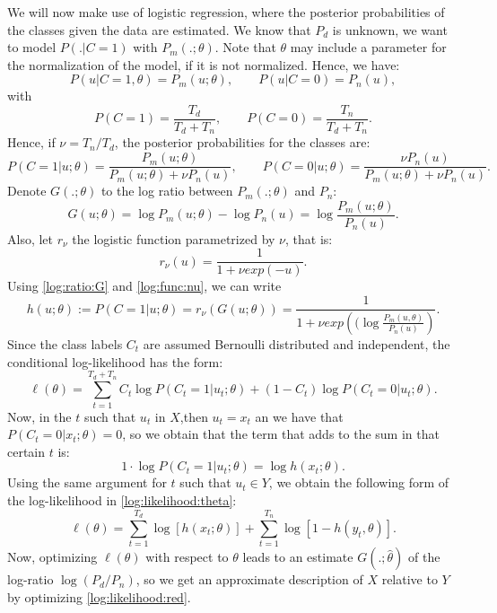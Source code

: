 We will now make use of logistic regression, where the posterior probabilities of the classes given the data are estimated. We know that $P_d$ is unknown, we want to model $P(.|C=1)$ with $P_m(.;\theta)$. Note that $\theta$ may include a parameter for the normalization of the model, if it is not normalized. Hence, we have:
\[
P(u|C = 1,\theta) = P_m(u;\theta), \quad \quad P(u|C = 0) = P_n(u),
\]
with
\[
P(C = 1) = \frac{T_d}{T_d + T_n}, \quad \quad P(C = 0) = \frac{T_n}{T_d + T_n}.
\]
Hence, if $\nu = T_n/T_d$, the posterior probabilities for the classes are:
\[
P(C=1|u;\theta) = \frac{P_m(u;\theta)}{P_m(u;\theta) + \nu P_n(u)}, \quad \quad P(C = 0|u; \theta) = \frac{\nu P_n(u)}{P_m(u;\theta) + \nu P_n(u)}.
\]
Denote $G(.;\theta)$ to the log ratio between $P_m(.;\theta)$ and $P_n$:
\begin{equation}\label{log:ratio:G}
G(u;\theta) = \log P_m(u;\theta) - \log P_n(u) = \log \frac{P_m(u;\theta)}{P_n(u)}.
\end{equation}
Also, let $r_\nu$ the logistic function parametrized by $\nu$, that is:
\begin{equation}\label{log:func:nu}
r_\nu(u) = \frac{1}{1 + \nu exp(-u)}.
\end{equation}
Using \eqref{log:ratio:G} and \eqref{log:func:nu}, we can write
\[
h(u;\theta) := P(C = 1|u ; \theta) =    r_\nu(G(u;\theta)) = \frac{1}{1+ \nu exp\left((\log \frac{P_m(u,\theta)}{P_n(u)}\right)}. 
\]
Since the class labels $C_t$ are assumed Bernoulli distributed and independent, the conditional log-likelihood has the form:
\begin{equation}\label{log:likelihood:theta}
\ell(\theta)  = \sum_{t = 1}^{T_d + T_n} C_t \log P(C_t = 1|u_t; \theta) + (1-C_t) \log P(C_t = 0|u_t;\theta).
\end{equation}
Now, in the $t$ such that $u_t$ in $X$,then  $u_t = x_t$ an we have that $P(C_t = 0|x_t;\theta) = 0$, so we obtain that the term that adds to the sum in that certain $t$ is:
\[
1\cdot \log P(C_t = 1|u_t;\theta) = \log h(x_t;\theta).
\]
Using the same argument for $t$ such that $u_t \in Y$, we obtain the following form of the log-likelihood in \eqref{log:likelihood:theta}:
\begin{equation}\label{log:likelihood:red}
\ell(\theta) = \sum_{t = 1}^{T_d} \log [h(x_t;\theta)] + \sum_{t = 1}^{T_n} \log[1- h(y_t,\theta)].
\end{equation}
Now, optimizing $\ell(\theta)$ with respect to $\theta$ leads to an estimate $G(.;\hat{\theta})$ of the log-ratio $\log (P_d/P_n)$, so we get an approximate description of $X$ relative to $Y$ by optimizing \eqref{log:likelihood:red}.

